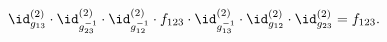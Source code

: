 \begin{equation}
  \id^{(2)}_{g_{13}}\cdot \id^{(2)}_{g_{23}^{-1}}\cdot \id^{(2)}_{g_{12}^{-1}}\cdot f_{123}
  \cdot \id^{(2)}_{g_{13}^{-1}}\cdot \id^{(2)}_{g_{12}}\cdot \id^{(2)}_{g_{23}} = f_{123}.
\end{equation}

